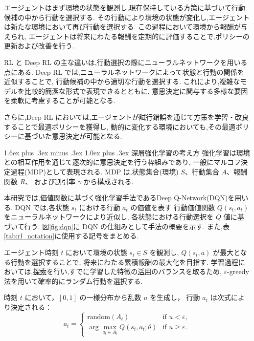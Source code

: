 \documentclass{jarticle}
\makeatletter
\renewcommand{\subsection}{%
  \@startsection{subsection}{2}{\z@}%
  {1.6ex plus .3ex minus .3ex}%
  {1.0ex plus .3ex}%
  {\LARGE\bfseries}%
}
\makeatother
\begin{document}
エージェントはまず環境の状態を観測し,現在保持している方策に基づいて行動候補の中から行動を選択する.
その行動により環境の状態が変化し,エージェントは新たな環境において再び行動を選択する.
この過程において環境から報酬が与えられ,
エージェントは将来にわたる報酬を定期的に評価することで,ポリシーの更新および改善を行う.

RL と Deep RL の主な違いは,行動選択の際にニューラルネットワークを用いる点にある.
Deep RL では,ニューラルネットワークによって状態と行動の関係を近似することで,
行動候補の中から適切な行動を選択する.
これにより,複雑なモデルを比較的簡潔な形式で表現できるとともに,
意思決定に関与する多様な要因を柔軟に考慮することが可能となる.

さらに,Deep RL においては,エージェントが試行錯誤を通じて方策を学習・改良することで最適ポリシーを獲得し,
動的に変化する環境においても,その最適ポリシーに基づいた意思決定が可能となる.

\subsection{深層強化学習の考え方}
強化学習は環境との相互作用を通じて逐次的に意思決定を行う枠組みであり,
一般にマルコフ決定過程(MDP)として表現される.
MDP は,状態集合(環境) $S$、行動集合 $A$、報酬関数 $R$、
および割引率 $\gamma$ から構成される.

本研究では,価値関数に基づく強化学習手法であるDeep Q-Network(DQN)を用いる.
DQN では,各状態 $s_t$ における行動 $a_t$ の価値を表す
行動価値関数 $Q(s_t,a_t)$ をニューラルネットワークにより近似し,
各状態における行動選択を $Q$ 値に基づいて行う.
図\ref{fig:dqn}に DQN の仕組みとして手法の概要を示す.
また,表\ref{tab:rl_notation}に使用する記号をまとめる.

エージェント時刻 $t$ において環境の状態 $s_t \in S$ を観測し,
$Q(s_t,a)$ が最大となる行動を選択することで,
将来にわたる累積報酬の最大化を目指す.
学習過程においては,\underline{探索}を行い,すでに学習した特徴の\underline{活用}のバランスを取るため,
$\varepsilon$-greedy 法を用いて確率的にランダム行動を選択する.

時刻 $t$ において，$[0,1]$ の一様分布から乱数 $u$ を生成し，
行動 $a_t$ は次式により決定される：
\begin{equation}
a_t =
\begin{cases}
\text{random}(A_t) 
& \text{if } u < \varepsilon, \\[6pt]
\displaystyle \arg\max_{a_t \in A_t} Q(s_t,a_t;\theta)
& \text{if } u \ge \varepsilon.
\end{cases}
\label{eq:epsilon_greedy}
\end{equation}
\end{document}
